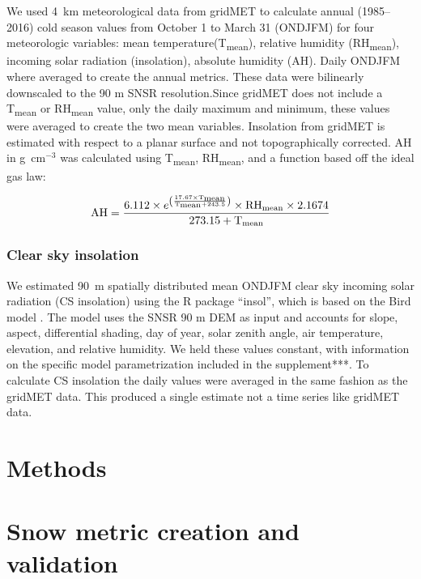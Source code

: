 We used 4~km meteorological data from gridMET \citep{abatzoglouDevelopmentGriddedSurface2013} to calculate annual (1985--2016) cold season values from October 1 to March 31 (ONDJFM) for four meteorologic variables: mean temperature(T\textsubscript{mean}), relative humidity (RH\textsubscript{mean}), incoming solar radiation (insolation), absolute humidity (AH). Daily ONDJFM where averaged to create the annual metrics. These data were bilinearly downscaled to the 90 m SNSR resolution.Since gridMET does not include a T\textsubscript{mean} or RH\textsubscript{mean} value, only the daily maximum and minimum, these values were averaged to create the two mean variables. Insolation from gridMET is estimated with respect to a planar surface and not topographically corrected. AH in g~cm$^{-3}$ was calculated using T\textsubscript{mean}, RH\textsubscript{mean}, and a function based off the ideal gas law:

\begin{equation}
\text{AH} = \frac{{6.112 \times e^{\left(\frac{{17.67 \times \text{T}\textsubscript{mean}}}{{\text{T}\textsubscript{mean} + 243.5}} \right)} \times \text{RH}\textsubscript{mean} \times 2.1674}} {{273.15 + \text{T}\textsubscript{mean}}}
\label{eq:ah}
\end{equation}


\hypertarget{ch2-do-2}{\subsubsection{Clear sky insolation}\label{ch2-do-2}}


We estimated 90~m spatially distributed mean ONDJFM clear sky incoming solar radiation (CS insolation) using the R package “insol”, which is based on the Bird model \citep{birdReviewEvaluationImprovement1981}. The model uses the SNSR 90 m DEM as input and accounts for slope, aspect, differential shading, day of year, solar zenith angle, air temperature, elevation, and relative humidity. We held these values constant, with information on the specific model parametrization included in the supplement***. To calculate CS insolation the daily values were averaged in the same fashion as the gridMET data. This produced a single estimate not a time series like gridMET data.


\hypertarget{ch2-methods}{\section{Methods}\label{ch2-methods}}
\hypertarget{ch2-methods-1}{\section{Snow metric creation and validation}\label{ch2-methods-1}}

